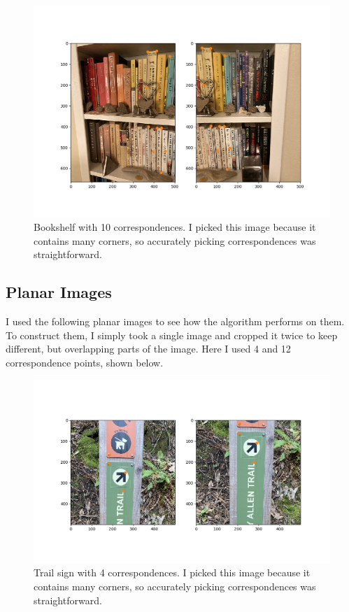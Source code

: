 \documentclass[]{article}
\begin{document}
	\begin{figure}[H]
		\centering
		\includegraphics[width=6.5in]{test_images/shelf_10_correspondences.png}
		\caption{Bookshelf with 10 correspondences. I picked this image because it contains many corners, so accurately picking correspondences was straightforward.}
	\end{figure}

	\subsection{Planar Images}
		I used the following planar images to see how the algorithm performs on them. To construct them, I simply took a single image and cropped it twice to keep different, but overlapping parts of the image. Here I used 4 and 12 correspondence points, shown below.
		
		\begin{figure}[H]
			\centering
			\includegraphics[width=6.5in]{test_images/sign_4_correspondences.png}
			\caption{Trail sign with 4 correspondences. I picked this image because it contains many corners, so accurately picking correspondences was straightforward.}
		\end{figure}
		
\end{document}
